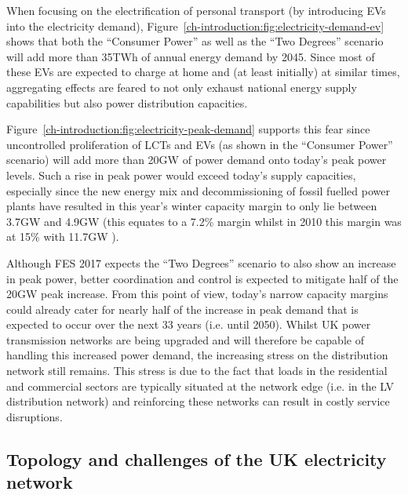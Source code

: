 

When focusing on the electrification of personal transport (by introducing EVs into the electricity demand), Figure~\ref{ch-introduction:fig:electricity-demand-ev} shows that both the ``Consumer Power'' as well as the ``Two Degrees'' scenario will add more than 35TWh of annual energy demand by 2045.
Since most of these EVs are expected to charge at home and (at least initially) at similar times, aggregating effects are feared to not only exhaust national energy supply capabilities but also power distribution capacities.




Figure~\ref{ch-introduction:fig:electricity-peak-demand} supports this fear since uncontrolled proliferation of LCTs and EVs (as shown in the ``Consumer Power'' scenario) will add more than 20GW of power demand onto today's peak power levels.
Such a rise in peak power would exceed today's supply capacities, especially since the new energy mix and decommissioning of fossil fuelled power plants have resulted in this year's winter capacity margin to only lie between 3.7GW and 4.9GW \cite{NationalGrid2017a} (this equates to a 7.2\% margin whilst in  2010 this margin was at 15\% with 11.7GW \cite{NationalGrid2010}).

Although FES 2017 expects the ``Two Degrees'' scenario to also show an increase in peak power, better coordination and control is expected to mitigate half of the 20GW peak increase.
From this point of view, today's narrow capacity margins could already cater for nearly half of the increase in peak demand that is expected to occur over the next 33 years (i.e. until 2050).
Whilst UK power transmission networks are being upgraded and will therefore be capable of handling this increased power demand, the increasing stress on the distribution network still remains.
This stress is due to the fact that loads in the residential and commercial sectors are typically situated at the network edge (i.e. in the LV distribution network) and reinforcing these networks can result in costly service disruptions.

\subsection{Topology and challenges of the UK electricity network}
\label{ch-introduction:subsec:topology-of-lv-network}

